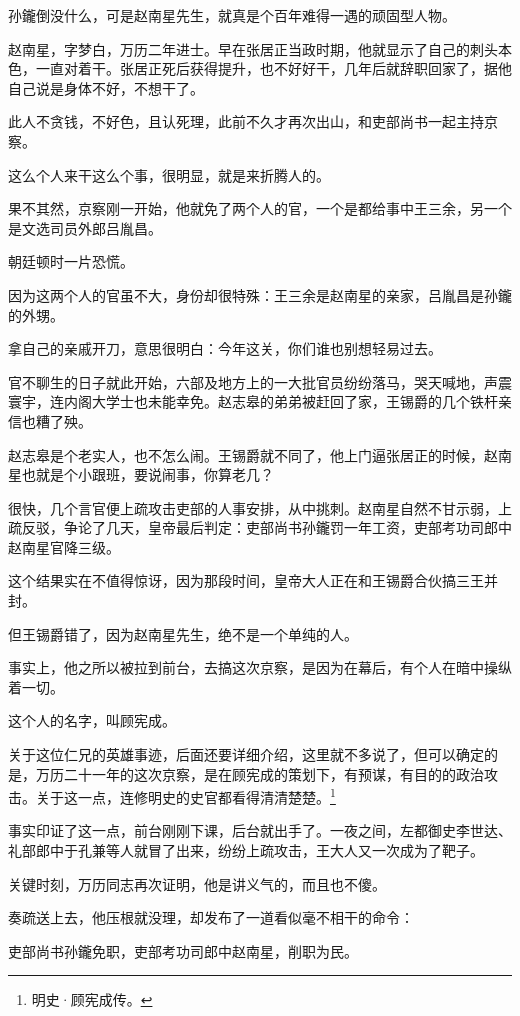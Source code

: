 \begin{multicols}{\theparacolNo}
孙鑨倒没什么，可是赵南星先生，就真是个百年难得一遇的顽固型人物。

赵南星，字梦白，万历二年进士。早在张居正当政时期，他就显示了自己的刺头本色，一直对着干。张居正死后获得提升，也不好好干，几年后就辞职回家了，据他自己说是身体不好，不想干了。

此人不贪钱，不好色，且认死理，此前不久才再次出山，和吏部尚书一起主持京察。

这么个人来干这么个事，很明显，就是来折腾人的。

果不其然，京察刚一开始，他就免了两个人的官，一个是都给事中王三余，另一个是文选司员外郎吕胤昌。

朝廷顿时一片恐慌。

因为这两个人的官虽不大，身份却很特殊：王三余是赵南星的亲家，吕胤昌是孙鑨的外甥。

拿自己的亲戚开刀，意思很明白：今年这关，你们谁也别想轻易过去。

官不聊生的日子就此开始，六部及地方上的一大批官员纷纷落马，哭天喊地，声震寰宇，连内阁大学士也未能幸免。赵志皋的弟弟被赶回了家，王锡爵的几个铁杆亲信也糟了殃。

赵志皋是个老实人，也不怎么闹。王锡爵就不同了，他上门逼张居正的时候，赵南星也就是个小跟班，要说闹事，你算老几？

很快，几个言官便上疏攻击吏部的人事安排，从中挑刺。赵南星自然不甘示弱，上疏反驳，争论了几天，皇帝最后判定：吏部尚书孙鑨罚一年工资，吏部考功司郎中赵南星官降三级。

这个结果实在不值得惊讶，因为那段时间，皇帝大人正在和王锡爵合伙搞三王并封。

但王锡爵错了，因为赵南星先生，绝不是一个单纯的人。

事实上，他之所以被拉到前台，去搞这次京察，是因为在幕后，有个人在暗中操纵着一切。

这个人的名字，叫顾宪成。

关于这位仁兄的英雄事迹，后面还要详细介绍，这里就不多说了，但可以确定的是，万历二十一年的这次京察，是在顾宪成的策划下，有预谋，有目的的政治攻击。关于这一点，连修明史的史官都看得清清楚楚。\footnote{明史·顾宪成传。}

事实印证了这一点，前台刚刚下课，后台就出手了。一夜之间，左都御史李世达、礼部郎中于孔兼等人就冒了出来，纷纷上疏攻击，王大人又一次成为了靶子。

关键时刻，万历同志再次证明，他是讲义气的，而且也不傻。

奏疏送上去，他压根就没理，却发布了一道看似毫不相干的命令：

吏部尚书孙鑨免职，吏部考功司郎中赵南星，削职为民。


\end{multicols}
